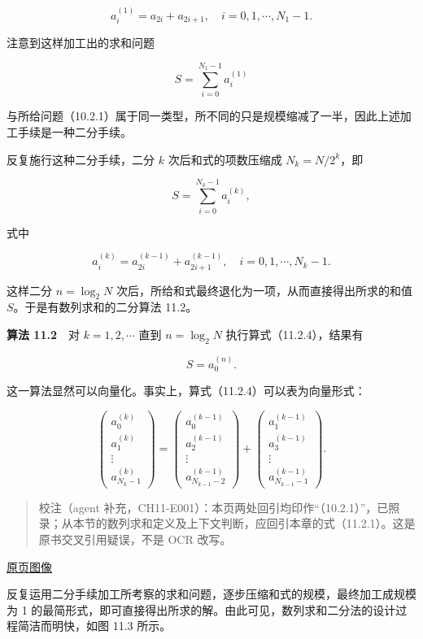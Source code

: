\documentclass[
  10pt,
  fontset=fandol]{ctexart}
\begin{document}
\[
a_i^{(1)}=a_{2i}+a_{2i+1},\quad i=0,1,\cdots,N_1-1.
\]

注意到这样加工出的求和问题

\[
S=\sum_{i=0}^{N_1-1}a_i^{(1)}
\]

与所给问题（10.2.1）属于同一类型，所不同的只是规模缩减了一半，因此上述加工手续是一种二分手续。

反复施行这种二分手续，二分 \(k\) 次后和式的项数压缩成 \(N_k=N/2^k\)，即

\[
S=\sum_{i=0}^{N_k-1}a_i^{(k)},
\]

式中

\[
a_i^{(k)}=a_{2i}^{(k-1)}+a_{2i+1}^{(k-1)},\quad i=0,1,\cdots,N_k-1.
\tag{11.2.4}
\]

这样二分 \(n=\log_2 N\) 次后，所给和式最终退化为一项，从而直接得出所求的和值 \(S\)。于是有数列求和的二分算法 11.2。

\textbf{算法 11.2}　对 \(k=1,2,\cdots\) 直到 \(n=\log_2 N\) 执行算式（11.2.4），结果有

\[
S=a_0^{(n)}.
\]

这一算法显然可以向量化。事实上，算式（11.2.4）可以表为向量形式：

\[
\begin{pmatrix}
a_0^{(k)}\\
a_1^{(k)}\\
\vdots\\
a_{N_k-1}^{(k)}
\end{pmatrix}
=
\begin{pmatrix}
a_0^{(k-1)}\\
a_2^{(k-1)}\\
\vdots\\
a_{N_{k-1}-2}^{(k-1)}
\end{pmatrix}
+
\begin{pmatrix}
a_1^{(k-1)}\\
a_3^{(k-1)}\\
\vdots\\
a_{N_{k-1}-1}^{(k-1)}
\end{pmatrix}.
\]

\begin{quote}
校注（agent 补充，CH11-E001）：本页两处回引均印作``（10.2.1）''，已照录；从本节的数列求和定义及上下文判断，应回引本章的式（11.2.1）。这是原书交叉引用疑误，不是 OCR 改写。
\end{quote}

\href{../../source-images/pdf-282.jpeg}{原页图像}

反复运用二分手续加工所考察的求和问题，逐步压缩和式的规模，最终加工成规模为 1 的最简形式，即可直接得出所求的解。由此可见，数列求和二分法的设计过程简洁而明快，如图 11.3 所示。
\end{document}
